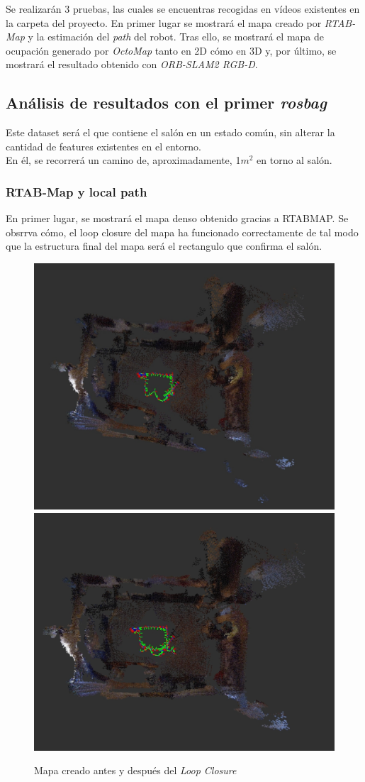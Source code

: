 Se realizarán 3 pruebas, las cuales se encuentras recogidas en vídeos existentes en la carpeta del proyecto. En primer lugar se mostrará el mapa creado por \textit{RTAB-Map} y
la estimación del \textit{path} del robot. Tras ello, se mostrará el mapa de ocupación generado por \textit{OctoMap} tanto en 2D cómo en 3D y, por último, se mostrará el
resultado obtenido con \textit{ORB-SLAM2 RGB-D}.
\newpage

\subsection{Análisis de resultados con el primer \textit{rosbag}}
Este dataset será el que contiene el salón en un estado común, sin alterar la cantidad de features existentes en el entorno. \\
En él, se recorrerá un camino de, aproximadamente, 1$m^2$ en torno al salón.

\subsubsection{RTAB-Map y local path}
En primer lugar, se mostrará el mapa denso obtenido gracias a RTABMAP. Se obsrrva cómo, el loop closure del mapa ha funcionado correctamente de tal modo que la estructura final
del mapa será el rectangulo que confirma el salón.
\begin{figure}[h!]
    \centering
    \includegraphics[width=.4\textwidth]{images/slam/bag1_rtabmap_noLC}
    \includegraphics[width=.415\textwidth]{images/slam/bag1_rtabmap_LC}
    \caption{Mapa creado antes y después del \textit{Loop Closure}}
\end{figure}

